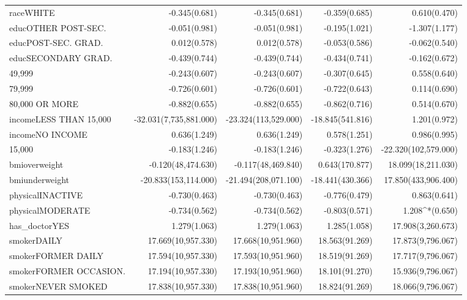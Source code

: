 \begin{longtable}{@{\extracolsep{5pt}}lD{.}{.}{-3} D{.}{.}{-3} D{.}{.}{-3} D{.}{.}{-3} }
  raceWHITE & -0.345$ $(0.681) & -0.345$ $(0.681) & -0.359$ $(0.685) & 0.610$ $(0.470) \\ 
  educOTHER POST-SEC. & -0.051$ $(0.981) & -0.051$ $(0.981) & -0.195$ $(1.021) & -1.307$ $(1.177) \\ 
  educPOST-SEC. GRAD. & 0.012$ $(0.578) & 0.012$ $(0.578) & -0.053$ $(0.586) & -0.062$ $(0.540) \\ 
  educSECONDARY GRAD. & -0.439$ $(0.744) & -0.439$ $(0.744) & -0.434$ $(0.741) & -0.162$ $(0.672) \\ 
  49,999 & -0.243$ $(0.607) & -0.243$ $(0.607) & -0.307$ $(0.645) & 0.558$ $(0.640) \\ 
  79,999 & -0.726$ $(0.601) & -0.726$ $(0.601) & -0.722$ $(0.643) & 0.114$ $(0.690) \\ 
  80,000 OR MORE & -0.882$ $(0.655) & -0.882$ $(0.655) & -0.862$ $(0.716) & 0.514$ $(0.670) \\ 
  incomeLESS THAN 15,000 & -32.031$ $(7,735,881.000) & -23.324$ $(113,529.000) & -18.845$ $(541.816) & 1.201$ $(0.972) \\ 
  incomeNO INCOME & 0.636$ $(1.249) & 0.636$ $(1.249) & 0.578$ $(1.251) & 0.986$ $(0.995) \\ 
  15,000 & -0.183$ $(1.246) & -0.183$ $(1.246) & -0.323$ $(1.276) & -22.320$ $(102,579.000) \\ 
  bmioverweight & -0.120$ $(48,474.630) & -0.117$ $(48,469.840) & 0.643$ $(170.877) & 18.099$ $(18,211.030) \\ 
  bmiunderweight & -20.833$ $(153,114.000) & -21.494$ $(208,071.100) & -18.441$ $(430.366) & 17.850$ $(433,906.400) \\ 
  physicalINACTIVE & -0.730$ $(0.463) & -0.730$ $(0.463) & -0.776$ $(0.479) & 0.863$ $(0.641) \\ 
  physicalMODERATE & -0.734$ $(0.562) & -0.734$ $(0.562) & -0.803$ $(0.571) & 1.208^{*}$ $(0.650) \\ 
  has\_doctorYES & 1.279$ $(1.063) & 1.279$ $(1.063) & 1.285$ $(1.058) & 17.908$ $(3,260.673) \\ 
  smokerDAILY & 17.669$ $(10,957.330) & 17.668$ $(10,951.960) & 18.563$ $(91.269) & 17.873$ $(9,796.067) \\ 
  smokerFORMER DAILY & 17.594$ $(10,957.330) & 17.593$ $(10,951.960) & 18.519$ $(91.269) & 17.717$ $(9,796.067) \\ 
  smokerFORMER OCCASION. & 17.194$ $(10,957.330) & 17.193$ $(10,951.960) & 18.101$ $(91.270) & 15.936$ $(9,796.067) \\ 
  smokerNEVER SMOKED & 17.838$ $(10,957.330) & 17.838$ $(10,951.960) & 18.824$ $(91.269) & 18.066$ $(9,796.067) \\ 

\end{longtable}
